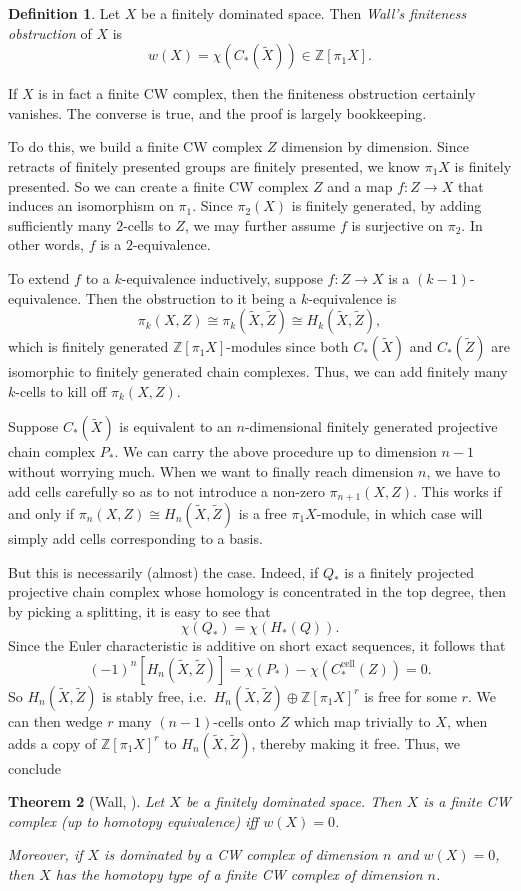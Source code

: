 \documentclass[a4paper, 12pt]{article}
\newtheorem{thm}{Theorem}[section]
\theoremstyle{definition}
\newtheorem{defi}[thm]{Definition}
\newcommand\Z{\mathbb{Z}}
\newcommand\cell{\mathrm{cell}}
\begin{document}
\begin{defi}
  Let $X$ be a finitely dominated space. Then \emph{Wall's finiteness obstruction} of $X$ is
  \[
    w(X) = \chi(C_*(\tilde{X})) \in \Z[\pi_1 X].
  \]
\end{defi}
If $X$ is in fact a finite CW complex, then the finiteness obstruction certainly vanishes. The converse is true, and the proof is largely bookkeeping.

To do this, we build a finite CW complex $Z$ dimension by dimension. Since retracts of finitely presented groups are finitely presented, we know $\pi_1 X$ is finitely presented. So we can create a finite CW complex $Z$ and a map $f: Z \to X$ that induces an isomorphism on $\pi_1$. Since $\pi_2(X)$ is finitely generated, by adding sufficiently many $2$-cells to $Z$, we may further assume $f$ is surjective on $\pi_2$. In other words, $f$ is a $2$-equivalence.

To extend $f$ to a $k$-equivalence inductively, suppose $f: Z \to X$ is a $(k - 1)$-equivalence. Then the obstruction to it being a $k$-equivalence is
\[
  \pi_k(X, Z) \cong \pi_k(\tilde{X}, \tilde{Z}) \cong H_k(\tilde{X}, \tilde{Z}),
\]
which is finitely generated $\Z[\pi_1 X]$-modules since both $C_*(\tilde{X})$ and $C_*(\tilde{Z})$ are isomorphic to finitely generated chain complexes. Thus, we can add finitely many $k$-cells to kill off $\pi_k(X, Z)$.

Suppose $C_*(\tilde{X})$ is equivalent to an $n$-dimensional finitely generated projective chain complex $P_*$. We can carry the above procedure up to dimension $n - 1$ without worrying much. When we want to finally reach dimension $n$, we have to add cells carefully so as to not introduce a non-zero $\pi_{n + 1}(X, Z)$. This works if and only if $\pi_n(X, Z) \cong H_n(\tilde{X}, \tilde{Z})$ is a free $\pi_1 X$-module, in which case will simply add cells corresponding to a basis.

But this is necessarily (almost) the case. Indeed, if $Q_*$ is a finitely projected projective chain complex whose homology is concentrated in the top degree, then by picking a splitting, it is easy to see that
\[
  \chi(Q_*) = \chi(H_*(Q)).
\]
Since the Euler characteristic is additive on short exact sequences, it follows that
\[
  (-1)^n [H_n(\tilde{X}, \tilde{Z})] = \chi(P_*) - \chi(C_*^{\cell}(Z)) = 0.
\]
So $H_n(\tilde{X}, \tilde{Z})$ is stably free, i.e.\ $H_n(\tilde{X}, \tilde{Z}) \oplus \Z[\pi_1 X]^r$ is free for some $r$. We can then wedge $r$ many $(n-1)$-cells onto $Z$ which map trivially to $X$, when adds a copy of $\Z[\pi_1 X]^r$ to $H_n(\tilde{X}, \tilde{Z})$, thereby making it free. Thus, we conclude
\begin{thm}[Wall, \cite{wall-finiteness}]
  Let $X$ be a finitely dominated space. Then $X$ is a finite CW complex (up to homotopy equivalence) iff $w(X) = 0$.

  Moreover, if $X$ is dominated by a CW complex of dimension $n$ and $w(X) = 0$, then $X$ has the homotopy type of a finite CW complex of dimension $n$.
\end{thm}
\end{document}
